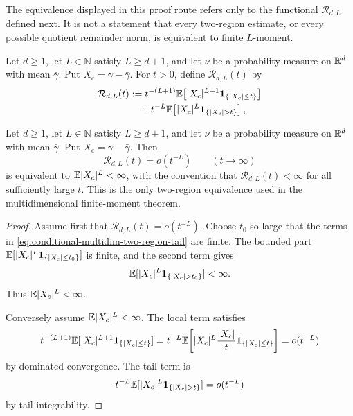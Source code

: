 The equivalence displayed in this proof route refers only to the functional
\(\mathcal R_{d,L}\) defined next.  It is not a statement that every
two-region estimate, or every possible quotient remainder norm, is equivalent
to finite \(L\)-moment.

\begin{definition}%
\label{def:two-region-remainder-functional}
Let \(d\ge1\), let \(L\in\mathbb N\) satisfy \(L\ge d+1\), and let \(\nu\) be
a probability measure on \(\mathbb{R}^d\) with mean \(\bar{\gamma}\).  Put
\(X_c=\gamma-\bar{\gamma}\).  For \(t>0\), define \(\mathcal R_{d,L}(t)\) by
\begin{equation}\label{eq:conditional-multidim-two-region-tail}
\begin{aligned}
\mathcal R_{d,L}(t)
&:=t^{-(L+1)}\EE\!\left[
|X_c|^{L+1}{\bf1}_{\{|X_c|\le t\}}\right] \\
&\quad{}+ t^{-L}\EE\!\left[
|X_c|^L{\bf1}_{\{|X_c|>t\}}\right],
\end{aligned}
\end{equation}
\end{definition}

\begin{lemma}%
\label{lem:two-region-remainder-equivalent-finite-moment}
Let \(d\ge1\), let \(L\in\mathbb N\) satisfy \(L\ge d+1\), and let \(\nu\) be
a probability measure on \(\mathbb{R}^d\) with mean \(\bar{\gamma}\).  Put
\(X_c=\gamma-\bar{\gamma}\).  Then
\[
\mathcal R_{d,L}(t)=o(t^{-L})
\qquad(t\to\infty)
\]
is equivalent to \(\mathbb{E}|X_c|^L<\infty\), with the convention that
\(\mathcal R_{d,L}(t)<\infty\) for all sufficiently large \(t\).
This is the only two-region equivalence used in the multidimensional
finite-moment theorem.
\end{lemma}

\begin{proof}
Assume first that \(\mathcal R_{d,L}(t)=o(t^{-L})\).  Choose \(t_0\) so large
that the terms in \eqref{eq:conditional-multidim-two-region-tail} are finite.
The bounded part \(\mathbb{E}[|X_c|^L{\bf1}_{\{|X_c|\le t_0\}}]\) is finite, and
the second term gives
\[
\EE[|X_c|^L{\bf1}_{\{|X_c|>t_0\}}]<\infty .
\]
Thus \(\mathbb{E}|X_c|^L<\infty\).

Conversely assume \(\mathbb{E}|X_c|^L<\infty\).  The local term satisfies
\[
t^{-(L+1)}\mathbb{E}[|X_c|^{L+1}{\bf1}_{\{|X_c|\le t\}}]
=t^{-L}\mathbb{E}\!\left[
|X_c|^L\frac{|X_c|}{t}{\bf1}_{\{|X_c|\le t\}}
\right]
=o(t^{-L})
\]
by dominated convergence.  The tail term is
\[
t^{-L}\EE[|X_c|^L{\bf1}_{\{|X_c|>t\}}]=o(t^{-L})
\]
by tail integrability.
\end{proof}

